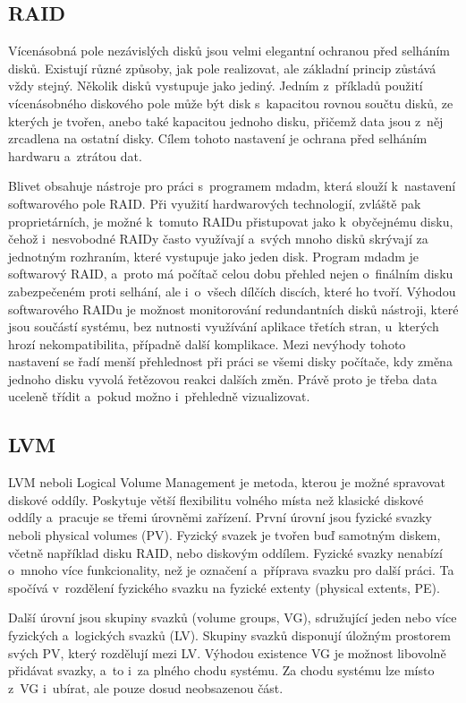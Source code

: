 \documentclass[printed,color,table,oneside,nolot,nolof]{fithesis}
\begin{document}
\subsection{RAID}
	Vícenásobná pole nezávislých disků jsou velmi elegantní ochranou před selháním disků. Existují různé způsoby, jak pole realizovat, ale základní princip zůstává vždy stejný. 
	Několik disků vystupuje jako jediný\cite{RAID}. Jedním z~příkladů použití vícenásobného diskového pole může být disk s~kapacitou rovnou součtu disků, ze kterých je tvořen, anebo také
	kapacitou jednoho disku, přičemž data jsou z~něj zrcadlena na ostatní disky. Cílem tohoto nastavení je ochrana před selháním hardwaru a~ztrátou dat. 
	
	Blivet obsahuje nástroje pro práci s~programem mdadm, která slouží k~nastavení softwarového pole RAID. Při využití hardwarových technologií, zvláště pak proprietárních,
	je možné k~tomuto RAIDu přistupovat jako k~obyčejnému disku, čehož i~nesvobodné RAIDy často využívají a~svých mnoho disků skrývají za jednotným rozhraním, které vystupuje jako jeden
	disk. 
	Program mdadm je softwarový RAID, a~proto má počítač celou dobu přehled nejen o~finálním disku zabezpečeném proti selhání, ale i~o~všech dílčích discích, které ho tvoří. Výhodou
	softwarového RAIDu je
	možnost monitorování redundantních disků nástroji, které jsou součástí systému, bez nutnosti využívání aplikace třetích stran, u~kterých hrozí nekompatibilita, případně další 
	komplikace.
	Mezi nevýhody tohoto nastavení se řadí menší přehlednost při práci se všemi disky počítače, kdy změna jednoho disku vyvolá řetězovou reakci dalších změn. Právě proto je třeba data uceleně třídit
	a~pokud možno i~přehledně vizualizovat.

\subsection{LVM}
  LVM neboli Logical Volume Management je metoda, kterou je možné spravovat diskové oddíly. Poskytuje větší flexibilitu volného místa než klasické diskové oddíly a~pracuje se třemi
	úrovněmi
	zařízení\cite{LVM}. První úrovní jsou fyzické svazky neboli physical volumes (PV). Fyzický svazek je tvořen buď samotným diskem, včetně například disku RAID, nebo diskovým oddílem. 
	Fyzické
	svazky nenabízí o~mnoho více funkcionality, než je označení a~příprava svazku pro další práci. Ta spočívá v~rozdělení fyzického svazku na fyzické extenty (physical extents, PE).

	Další úrovní jsou skupiny svazků (volume groups, VG), sdružující jeden nebo více fyzických a~logických svazků (LV). Skupiny svazků disponují úložným prostorem svých PV, 
	který rozdělují mezi LV. Výhodou existence VG je možnost libovolně přidávat svazky, a~to i~za plného chodu systému. Za chodu systému lze místo z~VG i~ubírat, ale 
	pouze dosud neobsazenou část. 
\end{document}
